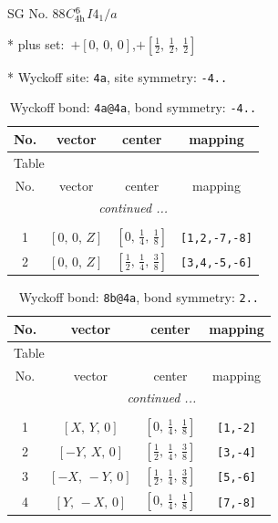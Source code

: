 \documentclass[fleqn,8pt]{jsarticle}
\begin{document}
\setcounter{MaxMatrixCols}{32}

\renewcommand{\tablename}{Table~}
\renewcommand{\figurename}{Figure~}
\begin{center}
\LARGE
SG No. 88\quad$C_{\rm 4h}^{6}$\quad$I4_1/a$\quad[ tetragonal ]
\end{center}

* plus set:\,\,\,$+\left[ 0,\, 0,\, 0 \right]$,\quad $+\left[ \frac{1}{2},\, \frac{1}{2},\, \frac{1}{2} \right]$


* Wyckoff site: {\tt 4a}, site symmetry: {\tt -4..}
\renewcommand{\arraystretch}{1.2}
\begin{longtable}{cccc}
\caption{Wyckoff bond: {\tt 4a@4a}, bond symmetry: {\tt -4..}}
 \\
 \hline \hline
No. & vector & center & mapping \\ \hline \endfirsthead

\multicolumn{3}{l}{\tablename\ \thetable{}} \\
 \hline \hline
No. & vector & center & mapping \\ \hline \endhead

 \hline \hline
\multicolumn{3}{r}{\footnotesize\it continued ...} \\ \endfoot

 \hline \hline
\multicolumn{3}{r}{} \\ \endlastfoot

1 & $\left[ 0,\, 0,\, Z \right]$ & $\left[ 0,\, \frac{1}{4},\, \frac{1}{8} \right]$ & {\tt [1,2,-7,-8]} \\ \hline
2 & $\left[ 0,\, 0,\, Z \right]$ & $\left[ \frac{1}{2},\, \frac{1}{4},\, \frac{3}{8} \right]$ & {\tt [3,4,-5,-6]} \\
\end{longtable}
\renewcommand{\arraystretch}{1.2}
\begin{longtable}{cccc}
\caption{Wyckoff bond: {\tt 8b@4a}, bond symmetry: {\tt 2..}}
 \\
 \hline \hline
No. & vector & center & mapping \\ \hline \endfirsthead

\multicolumn{3}{l}{\tablename\ \thetable{}} \\
 \hline \hline
No. & vector & center & mapping \\ \hline \endhead

 \hline \hline
\multicolumn{3}{r}{\footnotesize\it continued ...} \\ \endfoot

 \hline \hline
\multicolumn{3}{r}{} \\ \endlastfoot

1 & $\left[ X,\, Y,\, 0 \right]$ & $\left[ 0,\, \frac{1}{4},\, \frac{1}{8} \right]$ & {\tt [1,-2]} \\ \hline
2 & $\left[ - Y,\, X,\, 0 \right]$ & $\left[ \frac{1}{2},\, \frac{1}{4},\, \frac{3}{8} \right]$ & {\tt [3,-4]} \\ \hline
3 & $\left[ - X,\, - Y,\, 0 \right]$ & $\left[ \frac{1}{2},\, \frac{1}{4},\, \frac{3}{8} \right]$ & {\tt [5,-6]} \\ \hline
4 & $\left[ Y,\, - X,\, 0 \right]$ & $\left[ 0,\, \frac{1}{4},\, \frac{1}{8} \right]$ & {\tt [7,-8]} \\
\end{longtable}
\end{document}
